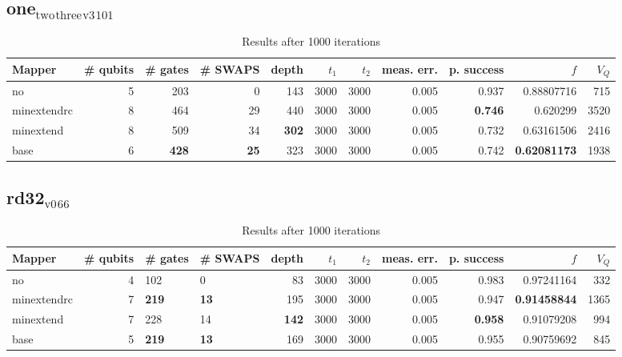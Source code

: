 \documentclass[11pt]{article}
\begin{document}
\subsection{one\(_{\text{two}}\)\(_{\text{three}}\)\(_{\text{v3}}\)\(_{\text{101}}\)}
\label{sec:orgf7e7e06}
\begin{table}[H]
\caption{\label{tab:org207b55c}
Results after 1000 iterations}
\centering
\small
\begin{tabular}{lrrrrrrrrrr}
\hline
Mapper & \# qubits & \# gates & \# SWAPS & depth & \(t_1\) & \(t_2\) & meas. err. & p. success & \(f\) & \(V_Q\)\\
\hline
no & 5 & 203 & 0 & 143 & 3000 & 3000 & 0.005 & 0.937 & 0.88807716 & 715\\
\hline
minextendrc & 8 & 464 & 29 & 440 & 3000 & 3000 & 0.005 & \textbf{0.746} & 0.620299 & 3520\\
minextend & 8 & 509 & 34 & \textbf{302} & 3000 & 3000 & 0.005 & 0.732 & 0.63161506 & 2416\\
base & 6 & \textbf{428} & \textbf{25} & 323 & 3000 & 3000 & 0.005 & 0.742 & \textbf{0.62081173} & 1938\\
\hline
\end{tabular}
\end{table}
\subsection{rd32\(_{\text{v0}}\)\(_{\text{66}}\)}
\label{sec:org09af8c4}
\begin{table}[H]
\caption{\label{tab:org33dedc4}
Results after 1000 iterations}
\centering
\small
\begin{tabular}{lrllrrrrrrr}
\hline
Mapper & \# qubits & \# gates & \# SWAPS & depth & \(t_1\) & \(t_2\) & meas. err. & p. success & \(f\) & \(V_Q\)\\
\hline
no & 4 & 102 & 0 & 83 & 3000 & 3000 & 0.005 & 0.983 & 0.97241164 & 332\\
\hline
minextendrc & 7 & \textbf{219} & \textbf{13} & 195 & 3000 & 3000 & 0.005 & 0.947 & \textbf{0.91458844} & 1365\\
minextend & 7 & 228 & 14 & \textbf{142} & 3000 & 3000 & 0.005 & \textbf{0.958} & 0.91079208 & 994\\
base & 5 & \textbf{219} & \textbf{13} & 169 & 3000 & 3000 & 0.005 & 0.955 & 0.90759692 & 845\\
\hline
\end{tabular}
\end{table}
\end{document}
